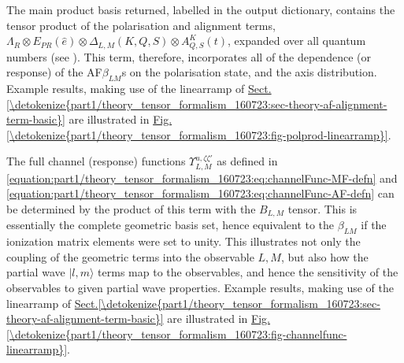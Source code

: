 \documentclass[letterpaper,table,10pt,english]{jupyterBook}
\begin{document}
\sphinxAtStartPar
The main product basis returned, labelled  in the output dictionary, contains the tensor product of the polarisation and alignment terms, \(\Lambda_{R}\otimes E_{PR}(\hat{e})\otimes \Delta_{L,M}(K,Q,S)\otimes A^{K}_{Q,S}(t)\), expanded over all quantum numbers (see ). This term, therefore, incorporates all of the dependence (or response) of the AF\sphinxhyphen{}\(\beta_{LM}\)s on the polarisation state, and the axis distribution. Example results, making use of the linear\sphinxhyphen{}ramp {\hyperref[\detokenize{backmatter/glossary:term-ADMs}]{}} of \hyperref[\detokenize{part1/theory_tensor_formalism_160723:sec-theory-af-alignment-term-basic}]{Sect.\@ \ref{\detokenize{part1/theory_tensor_formalism_160723:sec-theory-af-alignment-term-basic}}} are illustrated in \hyperref[\detokenize{part1/theory_tensor_formalism_160723:fig-polprod-linearramp}]{Fig.\@ \ref{\detokenize{part1/theory_tensor_formalism_160723:fig-polprod-linearramp}}}.

\sphinxAtStartPar
The full channel (response) functions \(\varUpsilon_{L,M}^{u,\zeta\zeta'}\) as defined in \eqref{equation:part1/theory_tensor_formalism_160723:eq:channelFunc-MF-defn} and \eqref{equation:part1/theory_tensor_formalism_160723:eq:channelFunc-AF-defn} can be determined by the product of this term with the \(B_{L,M}\) tensor. This is essentially the complete geometric basis set, hence equivalent to the {\hyperref[\detokenize{backmatter/glossary:term-AF}]{}}\sphinxhyphen{}\(\beta_{LM}\) if the ionization matrix elements were set to unity. This illustrates not only the coupling of the geometric terms into the observable \(L,M\), but also how the partial wave \(|l,m\rangle\) terms map to the observables, and hence the sensitivity of the observables to given partial wave properties. Example results, making use of the linear\sphinxhyphen{}ramp {\hyperref[\detokenize{backmatter/glossary:term-ADMs}]{}} of \hyperref[\detokenize{part1/theory_tensor_formalism_160723:sec-theory-af-alignment-term-basic}]{Sect.\@ \ref{\detokenize{part1/theory_tensor_formalism_160723:sec-theory-af-alignment-term-basic}}} are illustrated in \hyperref[\detokenize{part1/theory_tensor_formalism_160723:fig-channelfunc-linearramp}]{Fig.\@ \ref{\detokenize{part1/theory_tensor_formalism_160723:fig-channelfunc-linearramp}}}.
\end{document}
